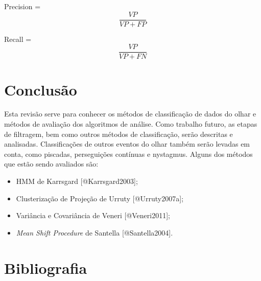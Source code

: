 Precision = \[\frac{VP}{VP+FP}\]

Recall = \[\frac{VP}{VP+FN}\]

\section{Conclusão}\label{conclusuxe3o}

Esta revisão serve para conhecer os métodos de classificação de dados do
olhar e métodos de avaliação dos algoritmos de análise. Como trabalho
futuro, as etapas de filtragem, bem como outros métodos de
classificação, serão descritas e analisadas. Classificações de outros
eventos do olhar também serão levadas em conta, como piscadas,
perseguições contínuas e nystagmus. Alguns dos métodos que estão sendo
avaliados são:

\begin{itemize}
\itemsep1pt\parskip0pt
\item
  HMM de Karrsgard {[}@Karrsgard2003{]};
\item
  Clusterização de Projeção de Urruty {[}@Urruty2007a{]};
\item
  Variância e Covariância de Veneri {[}@Veneri2011{]};
\item
  \emph{Mean Shift Procedure} de Santella {[}@Santella2004{]}.
\end{itemize}

\section{Bibliografia}\label{bibliografia}

